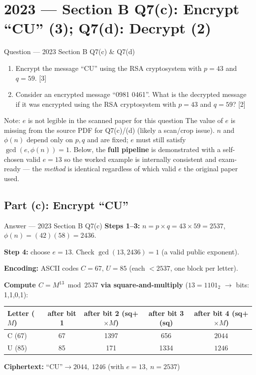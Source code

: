 \documentclass[12pt,a4paper]{article}
\begin{document}
\section{2023 --- Section B Q7(c): Encrypt ``CU'' (3); Q7(d): Decrypt (2)}

\begin{qbox}{Question --- 2023 Section B Q7(c) \& Q7(d)}
\begin{enumerate}[label=(\alph*)]
  \item[(c)] Encrypt the message ``CU'' using the RSA cryptosystem with $p=43$ and $q=59$. \hfill [3]
  \item[(d)] Consider an encrypted message ``0981 0461''. What is the decrypted message if it was encrypted using the RSA cryptosystem with $p=43$ and $q=59$? \hfill [2]
\end{enumerate}
\end{qbox}

\begin{warnbox}{Note: $e$ is not legible in the scanned paper for this question}
The value of $e$ is missing from the source PDF for Q7(c)/(d) (likely a scan/crop issue). $n$ and $\phi(n)$ depend only on $p,q$ and are fixed; $e$ must still satisfy $\gcd(e,\phi(n))=1$. Below, the \textbf{full pipeline} is demonstrated with a self-chosen valid $e=13$ so the worked example is internally consistent and exam-ready --- the \emph{method} is identical regardless of which valid $e$ the original paper used.
\end{warnbox}

\subsection{Part (c): Encrypt ``CU''}
\begin{solbox}{Answer --- 2023 Section B Q7(c)}
\textbf{Steps 1--3:} $n=p\times q=43\times59=\boxed{2537}$, \quad $\phi(n)=(42)(58)=\boxed{2436}$.

\textbf{Step 4:} choose $e=13$. Check $\gcd(13,2436)=1$ \checkmark (a valid public exponent).

\textbf{Encoding:} ASCII codes $C=67,\,U=85$ (each $<2537$, one block per letter).

\textbf{Compute $C=M^{13}\bmod 2537$ via square-and-multiply} ($13=1101_2$ $\to$ bits: 1,1,0,1):

\renewcommand{\arraystretch}{1.2}
\begin{center}
\begin{tabular}{lcccc}
\toprule
Letter ($M$) & after bit 1 & after bit 2 (sq+$\times M$) & after bit 3 (sq) & after bit 4 (sq+$\times M$) \\
\midrule
C (67) & 67 & 1397 & 656 & $\boxed{2044}$ \\
U (85) & 85 & 171 & 1334 & $\boxed{1246}$ \\
\bottomrule
\end{tabular}
\end{center}

\textbf{Ciphertext:} $\text{``CU''} \to \boxed{2044,\ 1246}$ \hfill (with $e=13,\ n=2537$)
\end{solbox}
\end{document}
